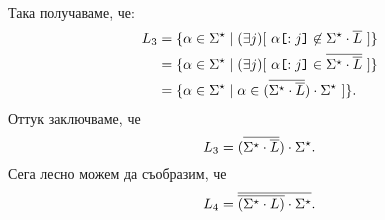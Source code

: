 \begin{extra}
\begin{hint}
\begin{align*}
  \end{align*}
  Така получаваме, че:
  \begin{align*}
    L_3 & = \{\alpha \in \Sigma^\star \mid (\exists j)[\ \alpha\slice{:j} \not\in \Sigma^\star \cdot \ov{L}\ ]\}\\
        & = \{\alpha \in \Sigma^\star \mid (\exists j)[\ \alpha\slice{:j} \in \ov{\Sigma^\star \cdot \ov{L}}\ ]\}\\
        & = \{\alpha \in \Sigma^\star \mid \alpha \in (\ov{\Sigma^\star \cdot \ov{L}}) \cdot \Sigma^\star \ ]\}.
  \end{align*}
  Оттук заключваме, че
  \[L_3 = (\overline{\Sigma^\star \cdot \overline{L}}) \cdot \Sigma^\star.\]
  Сега лесно можем да съобразим, че
  \[ L_4 = \overline{ \overline{(\Sigma^\star \cdot L)} \cdot \Sigma^\star}.\]
\end{hint}


\end{extra}
